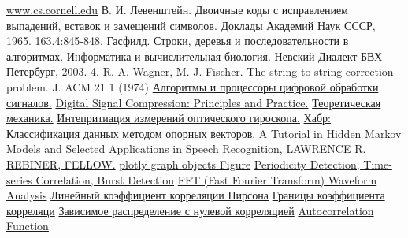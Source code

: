 \begin{thebibliography}{}
     \href{http://www.cs.cornell.edu/courses/cs4758/2012sp/materials/hmm_paper_rabiner.pdf}{www.cs.cornell.edu}
     В. И. Левенштейн. Двоичные коды с исправлением выпадений, вставок и
    замещений символов. Доклады Академий Наук СССР, 1965. 163.4:845-848.
     Гасфилд. Строки, деревья и последовательности в алгоритмах. Информатика и
    вычислительная биология. Невский Диалект БВХ-Петербург, 2003.
     4.	R. A. Wagner, M. J. Fischer. The string-to-string correction problem. J. ACM 21 1 (1974)
     \href{https://books.google.ru/books?id=iEO6AgAAQBAJ&pg=PA8&#v=onepage&q&f=false}{Алгоритмы и процессоры цифровой обработки сигналов.}
     \href{https://books.google.ru/books?id=s3H8s8rdsHkC&pg=PA83#v=onepage&q&f=false}{Digital Signal Compression: Principles and Practice.}
     \href{https://web.archive.org/web/20090708124031/http://mexman.ru/?p=6}{Теоретическая механика.}
     \href{http://journals.ioffe.ru/articles/viewPDF/8381}{Интепритиация измерений оптического гироскопа.}
     \href{https://habr.com/ru/post/105220/}{Хабр: Классификация данных методом опорных векторов.}
     \href{http://www.cs.cornell.edu/courses/cs4758/2012sp/materials/hmm_paper_rabiner.pdf}{A Tutorial in Hidden Markov Models and Selected Applications in Speech Recognition, LAWRENCE R. REBINER, FELLOW.}
    \bibitem{} \href{https://plotly.com/python-api-reference/generated/plotly.graph_objects.Figure.html}{plotly graph objects Figure}
    \bibitem{} \href{http://www.l3s.de/~anand/tir14/lectures/ws14-tir-foundations-2.pdf}{Periodicity Detection, Time-series Correlation, Burst Detection}
    \bibitem{} \href{https://www.dataq.com/data-acquisition/general-education-tutorials/fft-fast-fourier-transform-waveform-analysis.html}{FFT (Fast Fourier Transform) Waveform Analysis}
    \bibitem{} \href{https://statanaliz.info/statistica/korrelyaciya-i-regressiya/linejnyj-koefficient-korrelyacii-pirsona/}{Линейный коэффициент корреляции Пирсона}
    \bibitem{} \href{http://risktheory.novosyolov.com/topic_correl.htm}{Границы коэффициента корреляци}
    \bibitem{} \href{http://risktheory.novosyolov.com/ill_zerocorr.htm}{Зависимое распределение с нулевой корреляцией}
    \bibitem{} \href{https://s3.amazonaws.com/assets.datacamp.com/production/course_4267/slides/chapter2.pdf}{Autocorrelation Function}






\end{thebibliography}